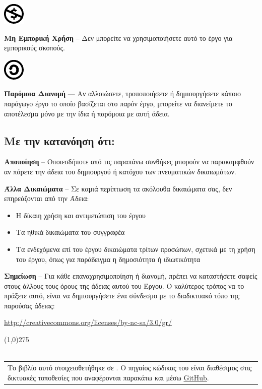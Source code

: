 \vspace{1em}
\noindent
\parbox{1.5cm}{\includegraphics[scale=0.15]{images/license/cc_nc_30}}
\parbox{10.5cm}{\textbf{Μη Εμπορική Χρήση} --  Δεν μπορείτε να χρησιμοποιήσετε αυτό το έργο για εμπορικούς σκοπούς.}

\vspace{1em}
\noindent
\parbox{1.5cm}{\includegraphics[scale=0.15]{images/license/cc_sa_30}}
\parbox{10.5cm}{\textbf{Παρόμοια Διανομή}  — Αν αλλοιώσετε, τροποποιήσετε ή δημιουργήσετε κάποιο παράγωγο έργο το οποίο βασίζεται στο παρόν έργο, μπορείτε να διανείμετε το αποτέλεσμα μόνο με την ίδια ή παρόμοια με αυτή άδεια.}

\subsection*{Με την κατανόηση ότι:}

\noindent
\textbf{Αποποίηση} -- Οποιεσδήποτε από τις παραπάνω συνθήκες μπορούν να παρακαμφθούν αν πάρετε την άδεια του δημιουργού ή κατόχου των πνευματικών δικαιωμάτων.

\vspace{1em}
\noindent
\textbf{Άλλα Δικαιώματα} -- Σε καμιά περίπτωση τα ακόλουθα δικαιώματα σας, δεν επηρεάζονται από την Άδεια:

\begin{itemize}
  \item Η δίκαιη χρήση και αντιμετώπιση του έργου
  \item Τα ηθικά δικαιώματα του συγγραφέα
  \item Τα ενδεχόμενα επί του έργου δικαιώματα τρίτων προσώπων, σχετικά με τη χρήση του έργου, όπως για παράδειγμα η δημοσιότητα ή ιδιωτικότητα
\end{itemize}

\vspace{1em}
\noindent
\textbf{Σημείωση} -- Για κάθε επαναχρησιμοποίηση ή διανομή, πρέπει να καταστήσετε σαφείς στους άλλους τους όρους της άδειας αυτού του Έργου. Ο καλύτερος τρόπος να το πράξετε αυτό, είναι να δημιουργήσετε ένα σύνδεσμο με το διαδικτυακό τόπο της παρούσας άδειας:
\begin{center}
\url{http://creativecommons.org/licenses/by-nc-sa/3.0/gr/}
\end{center}
\line(1,0){275}\\\\
\begin{tabular}{p{}}
Το βιβλίο αυτό στοιχειοθετήθηκε σε \XeLaTeX{}.  Ο πηγαίος κώδικας του είναι διαθέσιμος στις δικτυακές τοποθεσίες που αναφέρονται παρακάτω και μέσω \href{https://github.com/sonic2000gr/diktia}{GitHub}.\\
\end{tabular}

